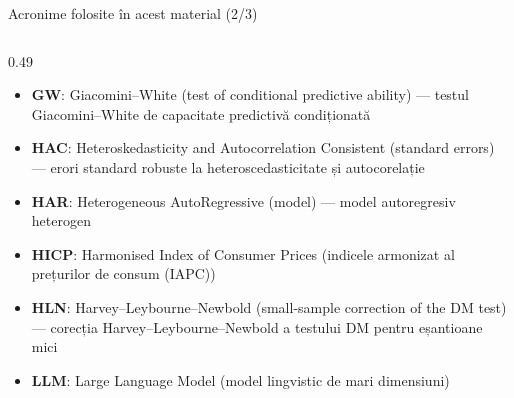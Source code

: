 \begin{frame}{Acronime folosite în acest material (2/3)}
\begin{columns}[T]
\begin{column}{0.49\textwidth}
\begin{itemize}
    \item \textbf{GW}: Giacomini–White (test of conditional predictive ability) — testul Giacomini–White de capacitate predictivă condiționată
    \item \textbf{HAC}: Heteroskedasticity and Autocorrelation Consistent (standard errors) — erori standard robuste la heteroscedasticitate și autocorelație
    \item \textbf{HAR}: Heterogeneous AutoRegressive (model) — model autoregresiv heterogen
    \item \textbf{HICP}: Harmonised Index of Consumer Prices (indicele armonizat al prețurilor de consum (IAPC))
    \item \textbf{HLN}: Harvey–Leybourne–Newbold (small-sample correction of the DM test) — corecția Harvey–Leybourne–Newbold a testului DM pentru eșantioane mici
    \item \textbf{LLM}: Large Language Model (model lingvistic de mari dimensiuni)
\end{itemize}
\end{column}
\end{columns}
\end{frame}

